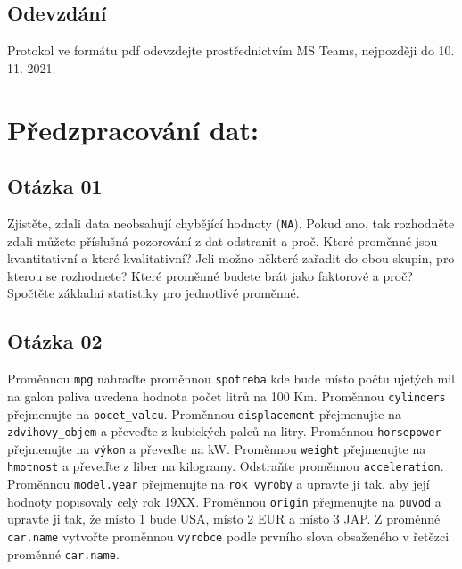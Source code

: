 \documentclass[
]{article}
\begin{document}
\hypertarget{odevzduxe1nuxed}{%
\subsection{Odevzdání}\label{odevzduxe1nuxed}}

Protokol ve formátu pdf odevzdejte prostřednictvím MS Teams, nejpozději
do 10. 11. 2021.

\hypertarget{pux159edzpracovuxe1nuxed-dat}{%
\section{Předzpracování dat:}\label{pux159edzpracovuxe1nuxed-dat}}

\hypertarget{otuxe1zka-01}{%
\subsection{Otázka 01}\label{otuxe1zka-01}}

Zjistěte, zdali data neobsahují chybějící hodnoty (\texttt{NA}). Pokud
ano, tak rozhodněte zdali můžete příslušná pozorování z dat odstranit a
proč. Které proměnné jsou kvantitativní a které kvalitativní? Jeli možno
některé zařadit do obou skupin, pro kterou se rozhodnete? Které proměnné
budete brát jako faktorové a proč? Spočtěte základní statistiky pro
jednotlivé proměnné.

\hypertarget{otuxe1zka-02}{%
\subsection{Otázka 02}\label{otuxe1zka-02}}

Proměnnou \texttt{mpg} nahraďte proměnnou \texttt{spotreba} kde bude
místo počtu ujetých mil na galon paliva uvedena hodnota počet litrů na
100 Km. Proměnnou \texttt{cylinders} přejmenujte na
\texttt{pocet\_valcu}. Proměnnou \texttt{displacement} přejmenujte na
\texttt{zdvihovy\_objem} a převeďte z kubických palců na litry.
Proměnnou \texttt{horsepower} přejmenujte na \texttt{výkon} a převeďte
na kW. Proměnnou \texttt{weight} přejmenujte na \texttt{hmotnost} a
převeďte z liber na kilogramy. Odstraňte proměnnou
\texttt{acceleration}. Proměnnou \texttt{model.year} přejmenujte na
\texttt{rok\_vyroby} a upravte ji tak, aby její hodnoty popisovaly celý
rok 19XX. Proměnnou \texttt{origin} přejmenujte na \texttt{puvod} a
upravte ji tak, že místo 1 bude USA, místo 2 EUR a místo 3 JAP. Z
proměnné \texttt{car.name} vytvořte proměnnou \texttt{vyrobce} podle
prvního slova obsaženého v řetězci proměnné \texttt{car.name}.
\end{document}
